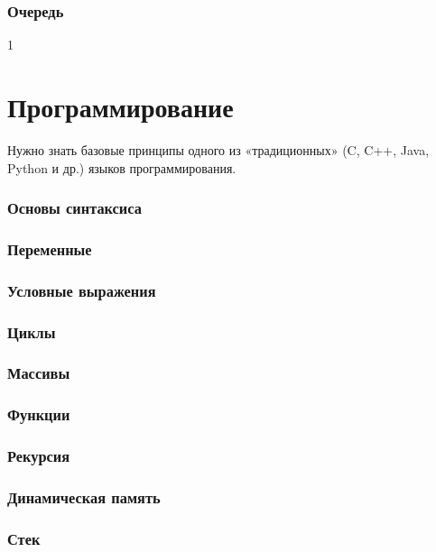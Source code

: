 \documentclass[12pt]{matmex-diploma}
\begin{document}
        \subsubsection*{Очередь}
            1
            
\section{Программирование}     

    Нужно знать базовые принципы одного из «традиционных» (C, C++, Java, Python и др.) языков программирования.
    
    \subsubsection*{Основы синтаксиса}
    
    \subsubsection*{Переменные}
    
    \subsubsection*{Условные выражения}
    
    \subsubsection*{Циклы}
    
    \subsubsection*{Массивы}
    
    \subsubsection*{Функции}
    
    \subsubsection*{Рекурсия}
    
    \subsubsection*{Динамическая память}
    
    \subsubsection*{Стек}
\end{document}
